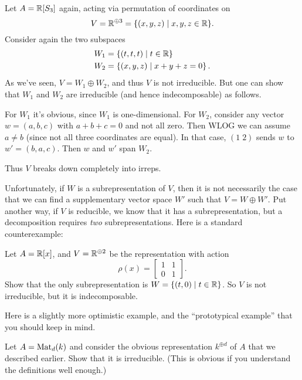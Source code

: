 \begin{example}
	Let $A = \mathbb R[S_3]$ again, acting via permutation of coordinates on
	\[ V = \mathbb R^{\oplus 3} = \{ (x,y,z) \mid x,y,z \in \mathbb R \}. \]
	Consider again the two subspaces
	\begin{align*}
		W_1 &= \left\{ (t,t,t) \mid t \in \mathbb R \right\} \\
		W_2 &= \left\{ (x,y,z) \mid x+y+z = 0 \right\}.
	\end{align*}
	As we've seen, $V = W_1 \oplus W_2$, and thus $V$ is not irreducible.
	But one can show that $W_1$ and $W_2$ are irreducible 
	(and hence indecomposable) as follows.
	\begin{itemize}
		\ii For $W_1$ it's obvious, since $W_1$ is one-dimensional.
		\ii For $W_2$, consider any vector $w = (a,b,c)$
		with $a+b+c=0$ and not all zero.  Then WLOG we can assume $a \neq b$ 
		(since not all three coordinates are equal).
		In that case, $(1 \; 2)$ sends $w$ to $w' = (b,a,c)$.
		Then $w$ and $w'$ span $W_2$.
	\end{itemize}
	Thus $V$ breaks down completely into irreps.
\end{example}

Unfortunately, if $W$ is a subrepresentation of $V$,
then it is not necessarily the case that we can find a
supplementary vector space $W'$ such that $V = W \oplus W'$.
Put another way, if $V$ is reducible, we know that it has a subrepresentation,
but a decomposition requires \emph{two} subrepresentations.
Here is a standard counterexample:
\begin{exercise}
	\label{exer:irred_not_indecomp}
	Let $A = \mathbb R[x]$, and $V = \mathbb R^{\oplus 2}$ be the representation with action
	\[ \rho(x) = \begin{bmatrix} 1 & 1 \\ 0 & 1 \end{bmatrix}. \]
	Show that the only subrepresentation is $W = \{ (t,0) \mid t \in \mathbb R \}$.
	So $V$ is not irreducible, but it is indecomposable.
\end{exercise}

Here is a slightly more optimistic example,
and the ``prototypical example'' that you should keep in mind.

\begin{exercise}
	Let $A = \mathrm{Mat}_d(k)$ and consider the obvious representation $k^{\oplus d}$
	of $A$ that we described earlier. Show that it is irreducible.
	(This is obvious if you understand the definitions well enough.)
\end{exercise}

